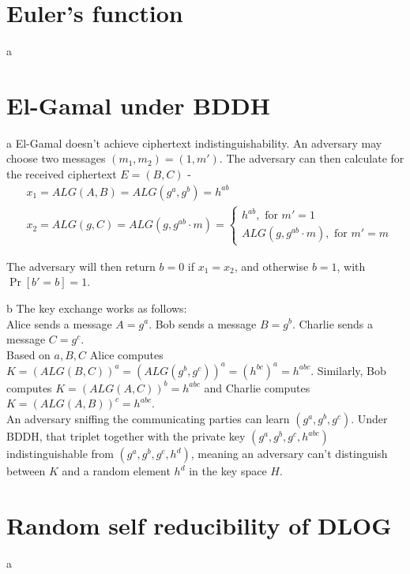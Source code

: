 \documentclass{article}
\begin{document}
\section{Euler's function}
\begin{paragraph}
	a
\end{paragraph}

\section{El-Gamal under BDDH}
\begin{paragraph}
	a El-Gamal doesn't achieve ciphertext indistinguishability. An adversary
	may choose two messages $(m_1, m_2) = (1, m')$.
	The adversary can then calculate for the received ciphertext $E = (B,C)$ - \\
	\begin{align*}
		&x_1 = ALG(A, B) = ALG(g^a, g^b) = h^{ab} \\
		&x_2 = ALG(g, C) = ALG(g, g^{ab}\cdot m) = 
		\begin{cases}
			h^{ab}, \mbox{ for } m' = 1 \\
			ALG(g, g^{ab}\cdot m), \mbox{ for } m' = m
		\end{cases}
	\end{align*}

	The adversary will then return $b = 0$ if $x_1 = x_2$, and otherwise $b = 1$,
	with $\Pr[b' = b] = 1$.
\end{paragraph}

\begin{paragraph}
	b The key exchange works as follows: \\
	Alice sends a message $A = g^a$. Bob sends a message $B = g^b$. Charlie
	sends a message $C = g^c$.\\
	Based on $a, B, C$ Alice computes $K = (ALG(B, C))^a = (ALG(g^b, g^c))^a
	 = (h^{bc})^a = h^{abc}$. Similarly, Bob computes $K = (ALG(A,C))^b
	  = h^{abc}$ and Charlie computes $K = (ALG(A,B))^c = h^{abc}$. \\
	An adversary sniffing the communicating parties can learn $(g^a, g^b, g^c)$.
	Under BDDH, that triplet together with the private key $(g^a, g^b, g^c, h^{abc})$
	indistinguishable from $(g^a, g^b, g^c, h^d)$, meaning an adversary
	can't distinguish between $K$ and a random element $h^d$ in the
	key space $H$.

\end{paragraph}

\section{Random self reducibility of DLOG}
\begin{paragraph}
	a 
\end{paragraph}
\end{document}
